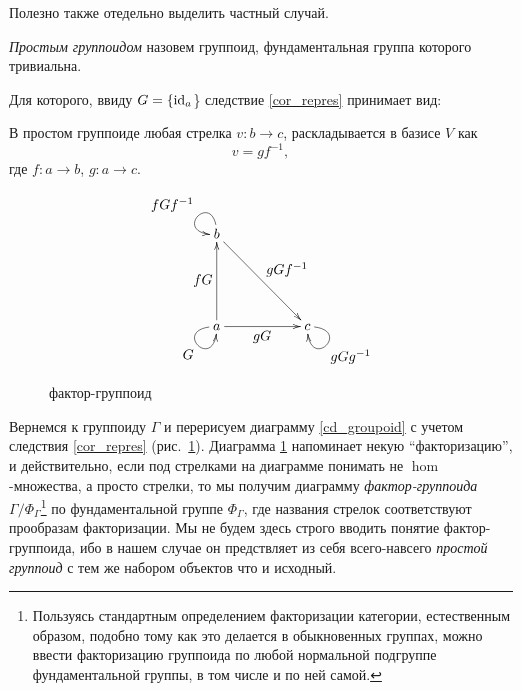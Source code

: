     Полезно также отедельно выделить частный случай.

    \begin{definition}
        \emph{Простым группоидом} назовем группоид, фундаментальная группа 
        которого тривиальна.
    \end{definition}

    Для которого, ввиду $G = \{\operatorname*{id}_a$\} следствие \ref{cor_repres} принимает вид:

    \begin{corollary}\label{cor_simple_grp}
        В простом группоиде любая стрелка $v : b \to c$, раскладывается в 
        базисе $V$ как
        \[v = gf^{-1},\]
        где $f : a \to b$, $g : a \to c$.
    \end{corollary}
    
    \begin{figure}[h]
        \centering
        \[\xymatrix{
            b \ar@(u,l)[]_{\textstyle fGf^{-1}} \ar[ddrr]^{\textstyle gGf^{-1}}             & &                             \\
                                                                                            & &                             \\
            a \ar@(l,d)[]_{\textstyle G} \ar[uu]^{\textstyle fG} \ar[rr]_{\textstyle gG}    & & c \ar@(r,d)[]^{\textstyle gGg^{-1}}
        }\]
        \caption{фактор-группоид}
        \label{cd_groupoid_repres}
    \end{figure}

    Вернемся к группоиду $\Gamma$ и перерисуем диаграмму \ref{cd_groupoid} с 
    учетом следствия \ref{cor_repres} (рис.~\ref{cd_groupoid_repres}). 
    Диаграмма \ref{cd_groupoid_repres} напоминает некую ``факторизацию'', и 
    действительно, если под стрелками на диаграмме понимать не $\hom$-множества,
    а просто стрелки, то мы получим диаграмму \emph{фактор-группоида} 
    $\Gamma/\Phi_\Gamma$\footnote{Пользуясь стандартным 
    определением факторизации категории\cite{MacLane}, естественным
    образом, подобно тому как это делается в обыкновенных группах, можно ввести 
    факторизацию группоида по любой нормальной подгруппе фундаментальной 
    группы, в том числе и по ней самой.} по фундаментальной группе $\Phi_\Gamma$, 
    где названия стрелок соответствуют прообразам 
    факторизации. Мы не будем здесь строго вводить понятие фактор-группоида, 
    ибо в нашем случае он предствляет из себя всего-навсего \emph{простой 
    группоид} с тем же набором объектов что и исходный.

